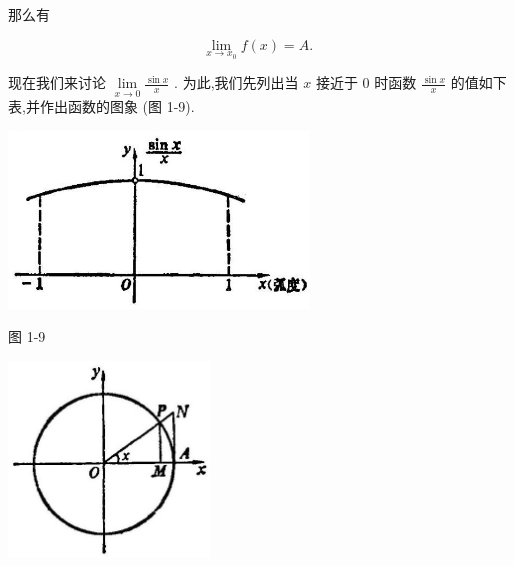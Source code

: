 \documentclass[10pt]{article}
\begin{document}
那么有

\[
\mathop{\lim }\limits_{{x \rightarrow {x}_{0}}}f\left( x\right) = A\text{. }
\]

现在我们来讨论 \(\mathop{\lim }\limits_{{x \rightarrow 0}}\frac{\sin x}{x}\) . 为此,我们先列出当 \(x\) 接近于 0 时函数 \(\frac{\sin x}{x}\) 的值如下表,并作出函数的图象 (图 1-9).

\begin{center}
\end{center}

\begin{center}
\includegraphics[max width=0.6\textwidth]{images/01912c18-5c3f-733d-b775-749ba9897a9d_42_483969.jpg}
\end{center}

图 1-9

\begin{center}
\includegraphics[max width=0.4\textwidth]{images/01912c18-5c3f-733d-b775-749ba9897a9d_42_838953.jpg}
\end{center}
\end{document}
